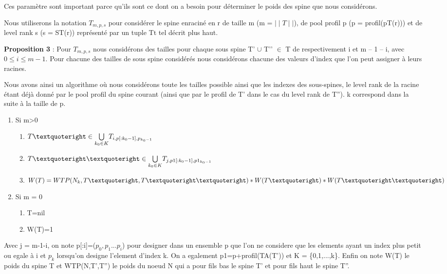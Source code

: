 \documentclass[french]{article}
\begin{document}
Ces paramètre sont important parce qu'ils sont ce dont on a besoin pour déterminer le poids des spine que nous considérons.

Nous utiliserons la notation \(T_{m,p,s} \) pour considérer le spine enraciné en r de taille m (m =  \(\mid\mid T\mid\mid\)), de pool profil p (p = profil(pT(r))) et de level rank s (s = ST(r)) représenté par un tuple Tt tel décrit plus haut.


\textbf{Proposition 3} :  Pour \(T_{m,p,s} \) nous considérons des tailles pour chaque sous spine T’ \(\cup\) T’’ \(\in\) T de respectivement i et m – 1 – i, avec \(0\leq i\leq m-1\). Pour chacune des tailles de sous spine considérés nous considérons chacune des valeurs d'index que l'on peut assigner à leurs racines.

Nous avons ainsi un algorithme où nous considérons toute les tailles possible ainsi que les indexes des sous-spines, le level rank de la racine étant déjà donné par le pool profil du spine courant (ainsi que par le profil de T' dans le cas du level rank de T''). k correspond dans la suite à la taille de p.
\newpage
\begin{enumerate}
    \item Si m>0
        \begin{enumerate}
            \item
            \(T\textquoteright \in \underset{k_0\in K}{\bigcup} T_{i,p[:k_0-1],p_{k_0-1}} \)
            \item
            \(T\textquoteright\textquoteright \in \underset{k_0\in K}{\bigcup} T_{j,p1[:k_0-1],p1_{k_0-1}} \)
            \item
            \(W(T)=WTP(N_k,T\textquoteright,T\textquoteright\textquoteright)*W(T\textquoteright)*W(T\textquoteright\textquoteright)\)
        \end{enumerate}
 
    \item Si m = 0
        \begin{enumerate} 
            \item
            T=nil 
            \item
            W(T)=1
        \end{enumerate}
\end{enumerate}
Avec j = m-1-i, on note p[:i]=(\(p_0,p_1...p_i\)) pour designer dans un ensemble p que l'on ne considere que les elements ayant un index plus petit ou egale à i et \(p_{k}\) lorsqu'on designe l'element d'index k. On a egalement p1=p+profil(TA(T')) et K = \{0,1,...,k\}. Enfin on note W(T) le poids du spine T et WTP(N,T',T'') le poids du noeud N qui a pour fils bas le spine T' et pour fils haut le spine T''.
\vspace{5mm} %
\end{document}
